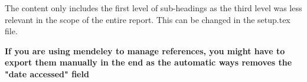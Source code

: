 \documentclass[12pt]{article}
\author{Abolgasem Esmaeily}
\begin{document}



\newpage
{}



\customtoc

The content only includes the first level of sub-headings as the third level was less relevant in the scope of the entire report. This can be changed in the setup.tex file.









% 

\newpage
{}
\textbf{If you are using mendeley to manage references, you might have to export them manually in the end as the automatic ways removes the "date accessed" field}
\printbibliography




\end{document}
